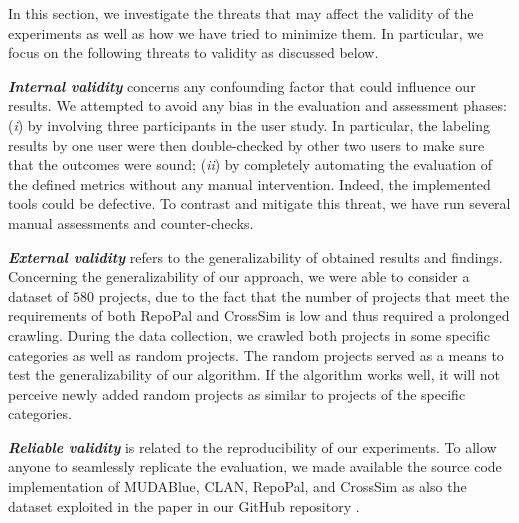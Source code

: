In this section, we investigate the threats that may affect the validity of the experiments as well as how we have tried to minimize them. In particular, we focus on the following threats to validity as discussed below. %

\textit{\textbf{Internal validity}}  concerns any confounding factor that could influence our results.  We attempted to avoid any bias in the evaluation and assessment
phases: (\emph{i}) by involving three participants in the user study. In particular, the labeling results by one user were then double-checked by other two users to make sure that the outcomes were sound; (\emph{ii}) by completely automating the evaluation of the defined metrics without any manual intervention. Indeed, the implemented tools could be defective. To contrast and mitigate this threat, we have run several manual assessments and counter-checks.

\textit{\textbf{External validity}}  refers to the generalizability of obtained results and findings. Concerning the generalizability of our approach, we were able to consider a dataset of $580$ projects, due to the fact that the number of projects that meet the requirements of both RepoPal and CrossSim is low and thus required a prolonged crawling. During the data collection, we crawled both projects in some specific categories as well as random projects. The random projects served as a means to test the generalizability of our algorithm. If the algorithm works well, it will not perceive newly added random projects as similar to projects of the specific categories.

\textit{\textbf{Reliable validity}}  is related to the reproducibility of our experiments. To allow anyone to seamlessly replicate the evaluation, we made available the source code implementation of MUDABlue, CLAN, RepoPal, and CrossSim as also the dataset exploited in the paper in our GitHub repository \cite{CROSSSIM-DATA}.